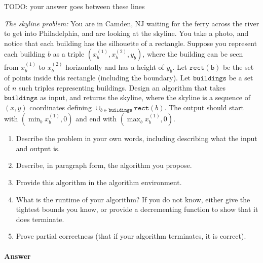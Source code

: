 \documentclass{article}
\begin{document}

TODO: your answer goes between these lines


\nextprob
{}

\emph{The skyline problem:} You are in Camden, NJ waiting for the ferry across the river to
get into Philadelphia, and are looking at the skyline.  You take a photo, and notice that each building
has the silhouette of a rectangle.  Suppose you  represent each building $b$ as a
triple $(x_b^{(1)},x_b^{(2)},y_b)$, where the building can be seen from $x_b^{(1)}$ to $x_b^{(2)}$
horizontally and has a height of $y_b$.  Let $\mathtt{rect(b)}$ be the set of
points inside this rectangle (including the boundary).  Let $\mathtt{buildings}$
be a set of $n$ such triples representing buildings. Design an algorithm that takes $\mathtt{buildings}$ as input, and
returns the skyline, where the skyline is a sequence of~$(x,y)$ coordinates
defining $\cup_{b \in \mathtt{buildings}} \mathtt{rect}(b)$.  The output should
start with $(\min_b{x_b^{(1)}},0)$ and end with $(\max_b{x_b^{(1)}},0)$.

\begin{enumerate}
    \item Describe the problem in your own words, including
        describing what the input and output is.
    \item Describe, in paragraph form, the algorithm you propose.
    \item Provide this algorithm in the algorithm environment.
    \item What is the runtime of your algorithm? If you do not know, either give
        the tightest bounds you know, or provide a decrementing function to show
        that it does terminate.
    \item Prove partial correctness (that if your algorithm terminates, it is
        correct).
\end{enumerate}



\paragraph{Answer}

\end{document}
